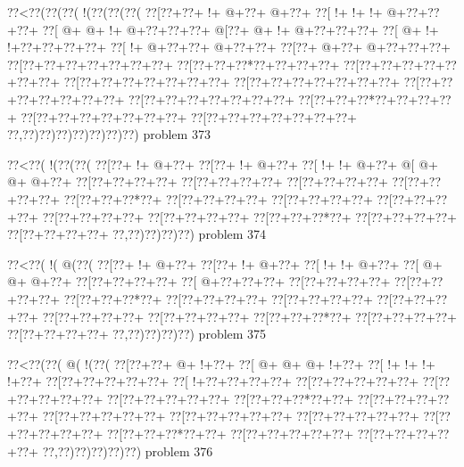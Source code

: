 \vbox{\vbox{\goo
\0??<\0??(\0??(\0??(\- !(\0??(\0??(\0??(
\0??[\0??+\0??+\- !+\- @+\0??+\- @+\0??+
\0??[\- !+\- !+\- !+\- @+\0??+\0??+\0??+
\0??[\- @+\- @+\- !+\- @+\0??+\0??+\0??+
\- @[\0??+\- @+\- !+\- @+\0??+\0??+\0??+
\0??[\- @+\- !+\- !+\0??+\0??+\0??+\0??+
\0??[\- !+\- @+\0??+\0??+\- @+\0??+\0??+
\0??[\0??+\- @+\0??+\- @+\0??+\0??+\0??+
\0??[\0??+\0??+\0??+\0??+\0??+\0??+\0??+
\0??[\0??+\0??+\0??*\0??+\0??+\0??+\0??+
\0??[\0??+\0??+\0??+\0??+\0??+\0??+\0??+
\0??[\0??+\0??+\0??+\0??+\0??+\0??+\0??+
\0??[\0??+\0??+\0??+\0??+\0??+\0??+\0??+
\0??[\0??+\0??+\0??+\0??+\0??+\0??+\0??+
\0??[\0??+\0??+\0??+\0??+\0??+\0??+\0??+
\0??[\0??+\0??+\0??*\0??+\0??+\0??+\0??+
\0??[\0??+\0??+\0??+\0??+\0??+\0??+\0??+
\0??[\0??+\0??+\0??+\0??+\0??+\0??+\0??+
\0??,\0??)\0??)\0??)\0??)\0??)\0??)\0??)
}
\hfil problem 373\hfil\break
}

\vbox{\vbox{\goo
\0??<\0??(\- !(\0??(\0??(
\0??[\0??+\- !+\- @+\0??+
\0??[\0??+\- !+\- @+\0??+
\0??[\- !+\- !+\- @+\0??+
\- @[\- @+\- @+\- @+\0??+
\0??[\0??+\0??+\0??+\0??+
\0??[\0??+\0??+\0??+\0??+
\0??[\0??+\0??+\0??+\0??+
\0??[\0??+\0??+\0??+\0??+
\0??[\0??+\0??+\0??*\0??+
\0??[\0??+\0??+\0??+\0??+
\0??[\0??+\0??+\0??+\0??+
\0??[\0??+\0??+\0??+\0??+
\0??[\0??+\0??+\0??+\0??+
\0??[\0??+\0??+\0??+\0??+
\0??[\0??+\0??+\0??*\0??+
\0??[\0??+\0??+\0??+\0??+
\0??[\0??+\0??+\0??+\0??+
\0??,\0??)\0??)\0??)\0??)
}
\hfil problem 374\hfil\break
}

\vbox{\vbox{\goo
\0??<\0??(\- !(\- @(\0??(
\0??[\0??+\- !+\- @+\0??+
\0??[\0??+\- !+\- @+\0??+
\0??[\- !+\- !+\- @+\0??+
\0??[\- @+\- @+\- @+\0??+
\0??[\0??+\0??+\0??+\0??+
\0??[\- @+\0??+\0??+\0??+
\0??[\0??+\0??+\0??+\0??+
\0??[\0??+\0??+\0??+\0??+
\0??[\0??+\0??+\0??*\0??+
\0??[\0??+\0??+\0??+\0??+
\0??[\0??+\0??+\0??+\0??+
\0??[\0??+\0??+\0??+\0??+
\0??[\0??+\0??+\0??+\0??+
\0??[\0??+\0??+\0??+\0??+
\0??[\0??+\0??+\0??*\0??+
\0??[\0??+\0??+\0??+\0??+
\0??[\0??+\0??+\0??+\0??+
\0??,\0??)\0??)\0??)\0??)
}
\hfil problem 375\hfil\break
}

\vbox{\vbox{\goo
\0??<\0??(\0??(\- @(\- !(\0??(
\0??[\0??+\0??+\- @+\- !+\0??+
\0??[\- @+\- @+\- @+\- !+\0??+
\0??[\- !+\- !+\- !+\- !+\0??+
\0??[\0??+\0??+\0??+\0??+\0??+
\0??[\- !+\0??+\0??+\0??+\0??+
\0??[\0??+\0??+\0??+\0??+\0??+
\0??[\0??+\0??+\0??+\0??+\0??+
\0??[\0??+\0??+\0??+\0??+\0??+
\0??[\0??+\0??+\0??*\0??+\0??+
\0??[\0??+\0??+\0??+\0??+\0??+
\0??[\0??+\0??+\0??+\0??+\0??+
\0??[\0??+\0??+\0??+\0??+\0??+
\0??[\0??+\0??+\0??+\0??+\0??+
\0??[\0??+\0??+\0??+\0??+\0??+
\0??[\0??+\0??+\0??*\0??+\0??+
\0??[\0??+\0??+\0??+\0??+\0??+
\0??[\0??+\0??+\0??+\0??+\0??+
\0??,\0??)\0??)\0??)\0??)\0??)
}
\hfil problem 376\hfil\break
}

